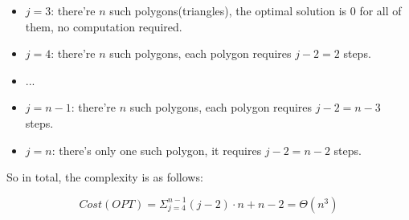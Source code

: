 \begin{itemize}
\item {$j = 3$}: there're $n$ such polygons(triangles), the optimal solution is 0 for all of them, no computation required.
\item {$j = 4$}: there're $n$ such polygons, each polygon requires $j - 2 = 2$ steps.
\item ...
\item {$j = n-1$}: there're $n$ such polygons, each polygon requires $j - 2 = n-3$ steps.
\item {$j = n$}: there's only one such polygon, it requires $j - 2 = n-2$ steps.
\end{itemize}

So in total, the complexity is as follows:

\[
  Cost(OPT) = \Sigma_{j=4}^{n-1}(j-2) \cdot n + n - 2 = \Theta(n^3)
\]
